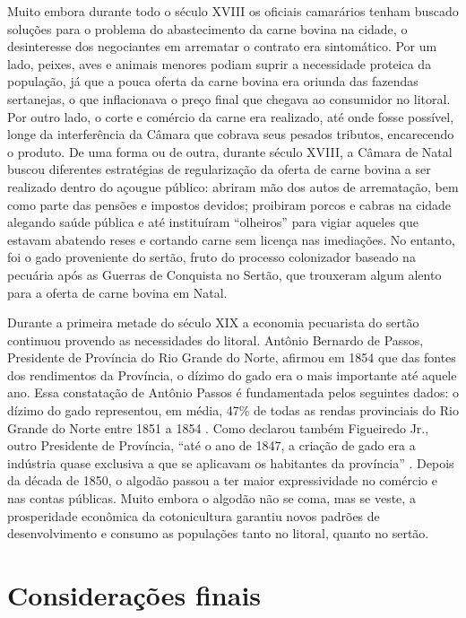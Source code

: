 \begin{refsection}
Muito embora durante todo o século XVIII os oficiais camarários tenham buscado soluções para o problema do abastecimento da carne bovina na cidade, o desinteresse dos negociantes em arrematar o contrato era sintomático. Por um lado, peixes, aves e animais menores podiam suprir a necessidade proteica da população, já que a pouca oferta da carne bovina era oriunda das fazendas sertanejas, o que inflacionava o preço final que chegava ao consumidor no litoral. Por outro lado, o corte e comércio da carne era realizado, até onde fosse possível, longe da interferência da Câmara que cobrava seus pesados tributos, encarecendo o produto. De uma forma ou de outra, durante século XVIII, a Câmara de Natal buscou diferentes estratégias de regularização da oferta de carne bovina a ser realizado dentro do açougue público: abriram mão dos autos de arrematação, bem como parte das pensões e impostos devidos; proibiram porcos e cabras na cidade alegando saúde pública e até instituíram “olheiros” para vigiar aqueles que estavam abatendo reses e cortando carne sem licença nas imediações. No entanto, foi o gado proveniente do sertão, fruto do processo colonizador baseado na pecuária após as Guerras de Conquista no Sertão, que trouxeram algum alento para a oferta de carne bovina em Natal.

Durante a primeira metade do século XIX a economia pecuarista do sertão continuou provendo as necessidades do litoral. Antônio Bernardo de Passos, Presidente de Província do Rio Grande do Norte, afirmou em 1854 que das fontes dos rendimentos da Província, o dízimo do gado era o mais importante até aquele ano. Essa constatação de Antônio Passos é fundamentada pelos seguintes dados: o dízimo do gado representou, em média, 47\% de todas as rendas provinciais do Rio Grande do Norte entre 1851 a 1854 \cite[p.~30]{Passos1854}. Como declarou também Figueiredo Jr., outro Presidente de Província, “até o ano de 1847, a criação de gado era a indústria quase exclusiva a que se aplicavam os habitantes da província” \citeyear[p.~37]{FigueiredoJr1861}. Depois da década de 1850, o algodão passou a ter maior expressividade no comércio e nas contas públicas. Muito embora o algodão não se coma, mas se veste, a prosperidade econômica da cotonicultura garantiu novos padrões de desenvolvimento e consumo as populações tanto no litoral, quanto no sertão. 

\section{Considerações finais}


\end{refsection}
